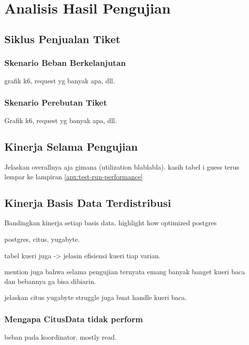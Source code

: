 \section{Analisis Hasil Pengujian}

\subsection{Siklus Penjualan Tiket}

\subsubsection{Skenario Beban Berkelanjutan}

grafik k6, request yg banyak apa, dll.

\subsubsection{Skenario Perebutan Tiket}

Grafik k6, request yg banyak apa, dll.

\subsection{Kinerja Selama Pengujian}

Jelaskan overallnya aja gimana (utilization blablabla). kasih tabel i guess terus lempar ke lampiran \ref{apx:test-run-performance}

\subsection{Kinerja Basis Data Terdistribusi}

Bandingkan kinerja setiap basis data. highlight how optimized postgres

postgres, citus, yugabyte.

tabel kueri juga -> jelasin efisiensi kueri tiap varian.

mention juga bahwa selama pengujian ternyata emang banyak banget kueri baca dan bebannya ga bisa dibiarin.

jelaskan citus yugabyte struggle juga buat handle kueri baca.

\subsubsection{Mengapa CitusData tidak perform}

beban pada koordinator. mostly read.

